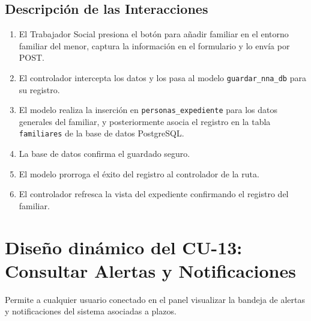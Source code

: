 \subsection{Descripción de las Interacciones}
\begin{enumerate}
    \item El Trabajador Social presiona el botón para añadir familiar en el entorno familiar del menor, captura la información en el formulario y lo envía por POST.
    \item El controlador intercepta los datos y los pasa al modelo \texttt{guardar\_nna\_db} para su registro.
    \item El modelo realiza la inserción en \texttt{personas\_expediente} para los datos generales del familiar, y posteriormente asocia el registro en la tabla \texttt{familiares} de la base de datos PostgreSQL.
    \item La base de datos confirma el guardado seguro.
    \item El modelo prorroga el éxito del registro al controlador de la ruta.
    \item El controlador refresca la vista del expediente confirmando el registro del familiar.
\end{enumerate}

\section{Diseño dinámico del CU-13: Consultar Alertas y Notificaciones}
\label{sec:disenoDinamicoCU13}

Permite a cualquier usuario conectado en el panel visualizar la bandeja de alertas y notificaciones del sistema asociadas a plazos.

